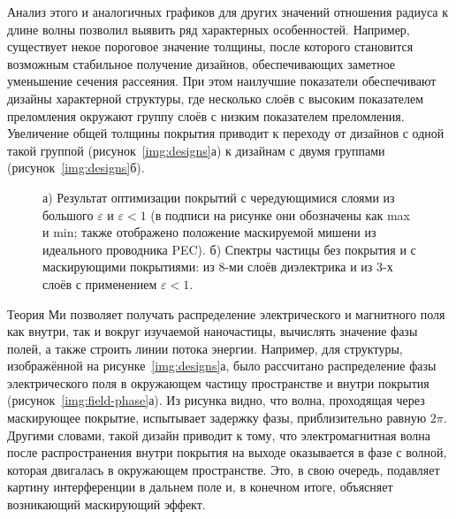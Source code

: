 Анализ этого и аналогичных графиков для других значений отношения
радиуса к длине волны позволил выявить ряд характерных
особенностей. Например, существует некое пороговое значение толщины,
после которого становится возможным стабильное получение дизайнов,
обеспечивающих заметное уменьшение сечения рассеяния. При этом
наилучшие показатели обеспечивают дизайны характерной структуры, где
несколько слоёв с высоким показателем преломления окружают группу
слоёв с низким показателем преломления. Увеличение общей толщины
покрытия приводит к переходу от дизайнов с одной такой группой
(рисунок~\ref{img:designs}а) к дизайнам с двумя группами
(рисунок~\ref{img:designs}б).

\begin{figure}[t]
  \begin{minipage}[ht]{0.49\linewidth}
  \end{minipage}
  \hfill
  \begin{minipage}[ht]{0.49\linewidth}
  \end{minipage}
  \caption{а) Результат оптимизации покрытий с чередующимися слоями из
    большого $\varepsilon$ и ${\varepsilon<1}$ (в подписи на рисунке
    они обозначены как max и min; также отображено положение маскируемой мишени из
    идеального проводника PEC). б) Спектры частицы
  без покрытия и с маскирующими покрытиями: из 8-ми слоёв диэлектрика и
  из 3-х слоёв с применением ${\varepsilon<1}$.}
  \label{img:min-max-min}  
\end{figure}


Теория Ми позволяет получать распределение электрического и магнитного
поля как внутри, так и вокруг изучаемой наночастицы, вычислять
значение фазы полей, а также строить линии потока энергии.  Например,
для структуры, изображённой на рисунке~\ref{img:designs}а, было
рассчитано распределение фазы электрического поля в окружающем частицу
пространстве и внутри покрытия (рисунок~\ref{img:field-phase}а).  Из
рисунка видно, что волна, проходящая через маскирующее покрытие,
испытывает задержку фазы, приблизительно равную $2\pi$. Другими
словами, такой дизайн приводит к тому, что электромагнитная волна
после распространения внутри покрытия на выходе оказывается в фазе с
волной, которая двигалась в окружающем пространстве.  Это, в свою
очередь, подавляет картину интерференции в дальнем поле и, в конечном
итоге, объясняет возникающий маскирующий эффект.

